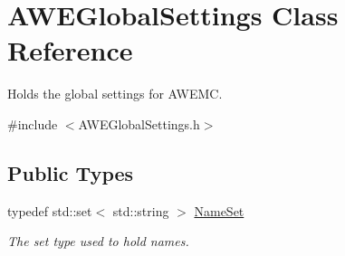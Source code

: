 \hypertarget{class_a_w_e_global_settings}{\section{A\-W\-E\-Global\-Settings Class Reference}
\label{class_a_w_e_global_settings}
}


Holds the global settings for A\-W\-E\-M\-C.  




{\ttfamily \#include $<$A\-W\-E\-Global\-Settings.\-h$>$}

\subsection*{Public Types}
\begin{DoxyCompactItemize}
\item 
\hypertarget{class_a_w_e_global_settings_a62d5ef5b82be32d6f025abe839436aba}{typedef std\-::set$<$ std\-::string $>$ \hyperlink{class_a_w_e_global_settings_a62d5ef5b82be32d6f025abe839436aba}{Name\-Set}}\label{class_a_w_e_global_settings_a62d5ef5b82be32d6f025abe839436aba}

\begin{DoxyCompactList}\small\item\em The set type used to hold names. \end{DoxyCompactList}\end{DoxyCompactItemize}
